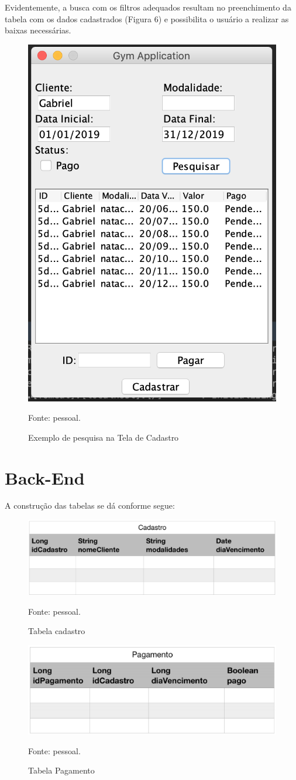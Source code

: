  Evidentemente, a busca com os filtros adequados resultam no preenchimento da tabela com os dados cadastrados (Figura 6) e possibilita o usuário a realizar as baixas necessárias.
 
 \begin{figure}[H]
 	\centering
 	\includegraphics[width=0.5\linewidth]{images/telaCadastroBuscaAposCadastro}
 	\caption{Exemplo de pesquisa na Tela de Cadastro}
 	Fonte: pessoal.
 	\label{fig:telaCadastroBuscaAposCadastro}
 \end{figure}
 
 \section{Back-End}
 
 A construção das tabelas se dá conforme segue:

\begin{figure}[H]
	\centering
	\includegraphics[width=0.7\linewidth]{images/tabelaCadastro}
	\caption{Tabela cadastro}
	Fonte: pessoal.
	\label{fig:tabelaCadastro}
\end{figure}

\begin{figure}[H]
	\centering
	\includegraphics[width=0.7\linewidth]{images/tabelaPagamento}
	\caption{Tabela Pagamento}
	Fonte: pessoal.
	\label{fig:tabelaPagamento}
\end{figure}